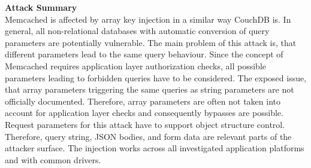 \textbf{Attack Summary} \\
Memcached is affected by array key injection in a similar way CouchDB is. In general, all non-relational databases with automatic conversion of query parameters are potentially vulnerable. The main problem of this attack is, that different parameters lead to the same query behaviour. Since the concept of Memcached requires application layer authorization checks, all possible parameters leading to forbidden queries have to be considered. The exposed issue, that array parameters triggering the same queries as string parameters are not officially documented. Therefore, array parameters are often not taken into account for application layer checks and consequently bypasses are possible. Request parameters for this attack have to support object structure control. Therefore, query string, JSON bodies, and form data are relevant parts of the attacker surface. The injection works across all investigated application platforms and with common drivers. 